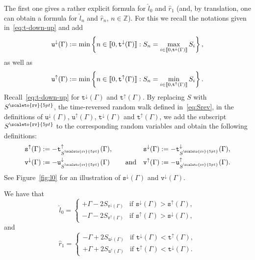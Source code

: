 \documentclass[AHL,Unicode,longabstracts,published]{cedram}
\newcommand{\bbZ}{\mathbb{Z}}
\newcommand{\gG}{\Gamma}
\renewcommand*\ss{\mathtt{u}}
\newcommand{\ttt}{\mathtt{t}}
\newcommand{\ttdown}{\ttt^\downarrow}
\newcommand{\ttup}{\ttt^\uparrow}
\newcommand{\tudown}{\ss^\downarrow}
\newcommand{\tuup}{\ss^\uparrow}
\newcommand{\ts}{\mathtt{s}}
\newcommand{\ttv}{\mathtt{v}}
\newcommand\mystrut{\rule{0pt}{6pt}}
\newcommand{\Srev}{S\mystrut^{\scaleto{\mathtt{rv}\mathstrut}{5pt}}}
\newcommand{\ls}{\widehat{l}}
\newcommand{\rs}{\widehat{r}}
\newcommand{\llbracket}{\mathopen{[\mkern -2.7mu[}}
\newcommand{\rrbracket}{\mathclose{]\mkern -2.7mu]}}
\newcommand{\lbra}{\llbracket}
\newcommand{\rbra}{\rrbracket}
\begin{document}
The first one gives a rather explicit formula for $\ls_0$ and $\rs_1$ (and, by translation, one can obtain a formula for $\ls_n$ and $\rs_n$, $n\in \bbZ$). For this we recall the notations given in~\eqref{eq:t-down-up} and add
\begin{equation}\label{eq:defudown}
\tudown(\gG):= \min\left\{ n \in \lbra 0, \ttt^\downarrow(\gG)\rbra: S_n= \max_{i \in \lbra 0, \ttt^\downarrow(\gG)\rbra} S_i\right\},
\end{equation}
as well as
\begin{equation}
\tuup(\gG):= \min\left\{ n \in \lbra 0, \ttt^\uparrow(\gG)\rbra: S_n= \min_{i \in \lbra 0, \ttt^\uparrow(\gG)\rbra} S_i\right\}.
\end{equation}
Recall~\eqref{eq:t-down-up} for $\ttt^\downarrow(\gG)$ and $\ttt^\uparrow(\gG)$. By replacing $S$ with $\Srev$, the time-reversed random walk defined in~\eqref{eq:Srev}, in the definitions of $\tudown(\gG)$, $\tuup(\gG)$, $\ttt^\downarrow(\gG)$ and $\ttt^\uparrow(\gG)$, we add the subscript $\Srev$ to the corresponding random variables and obtain the following definitions:
\begin{equation}\label{def-supdown}
\begin{aligned}
\ts^\uparrow (\gG)&:= -\ttup_{\Srev}(\gG),
\quad &
\ts^\downarrow (\gG) &:= -\ttdown_{\Srev}(\gG),
\\
\ttv^\downarrow (\gG)&:=-\tudown_{\Srev}(\gG) &\text{and}\quad
\ttv^\uparrow (\gG) &:=-\tuup_{\Srev}(\gG).
\end{aligned}
\end{equation}
See Figure~\ref{fig:l0} for an illustration of $\ts^\downarrow (\gG)$ and $\ttv^\downarrow (\gG)$.

\begin{prop}\label{th:explicit-hat}
We have that
\begin{equation}\label{eq:explicit-hat-l}
\widehat l_0 =
\begin{cases}
+\gG - 2 S_{\ttv^\downarrow (\gG)} & \text{if } \ts^\downarrow(\gG)> \ts^\uparrow(\gG),
\\
-\gG - 2 S_{\ttv^\uparrow (\gG)} & \text{if } \ts^\uparrow(\gG)> \ts^\downarrow(\gG),
\end{cases}
\end{equation}
and
\begin{equation}\label{eq:explicit-hat-r}
\rs_1=
\begin{cases}
-\Gamma+2 S_{\tudown(\gG)} & \text{if } \ttdown(\Gamma)<\ttup(\Gamma),\\
+\Gamma+2 S_{\tuup(\gG)} & \text{if } \ttup(\Gamma)<\ttdown(\Gamma).
\end{cases}
\end{equation}
\end{prop}
\end{document}
